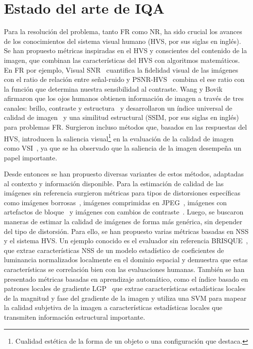 \section{Estado del arte de IQA}
Para la resolución del problema, tanto FR como NR, ha sido crucial los avances de los conocimientos 
del sistema visual humano (HVS, por sus siglas en inglés). Se han propuesto métricas inspiradas en el HVS y 
conscientes del contenido de la imagen, que combinan las características del HVS 
con algoritmos matemáticos. En FR por ejemplo, Visual SNR~\cite{VSNR} cuantifica 
la fidelidad visual de las imágenes con el ratio de relación entre señal-ruido y 
PSNR-HVS~\cite{PSNR-HVS} combina el ese ratio con la función que determina 
nuestra sensibilidad al contraste. 
Wang y Bovik afirmaron que los ojos humanos obtienen información de imagen a 
través de tres canales: brillo, contraste y estructura~\cite{SSIM} y desarrollaron 
un índice universal de calidad de imagen~\cite{UQI} y una similitud 
estructural (SSIM, por sus siglas en inglés)~\cite{SSIM} para problemas FR. Surgieron incluso métodos que, basados en las 
respuestas del HVS, introducen la saliencia visual\footnote{
  Cualidad estética de la forma de un objeto o una configuración que destaca.
} en la evaluación de la calidad de imagen como VSI~\cite{VSI}, 
ya que se ha observado que la saliencia de la imagen desempeña un papel importante.

Desde entonces se han propuesto diversas variantes de estos métodos, adaptadas 
al contexto y información disponible. 
Para la estimación de calidad de las imágenes sin referencia surgieron métricas para 
tipos de distorsiones específicas como 
imágenes borrosas~\cite{GradientBasedBlurAssessment}, 
imágenes comprimidas en JPEG~\cite{JPEGBasedOnLuminance}, 
imágenes con artefactos de bloque~\cite{DeblockedImages} y imágenes con 
cambios de contraste~\cite{ContrastDistorted}.
Luego, se buscaron maneras de estimar la calidad de imágenes de forma más genérica, 
sin depender del tipo de distorsión. Para ello, se han propuesto varias métricas 
basadas en NSS y el sistema HVS. 
Un ejemplo conocido es el evaluador sin referencia BRISQUE~\cite{BRISQUE}, que extrae 
características NSS de un modelo estadístico de coeficientes de luminancia 
normalizados localmente en el dominio espacial y demuestra que estas características 
se correlación bien con las evaluaciones humanas.
También se han presentado métricas basadas en aprendizaje automático, 
como el índice basado en patrones locales de gradiente LGP~\cite{LGP} que extrae 
características estadísticas locales de la magnitud y fase del gradiente de la imagen y utiliza una 
SVM para mapear la calidad subjetiva de la imagen a 
características estadísticas locales que transmiten información estructural importante.

